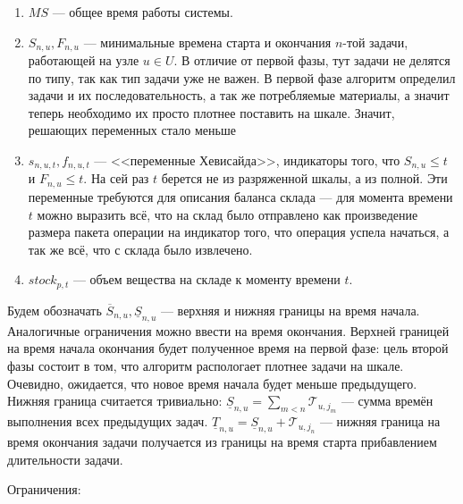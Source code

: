 \documentclass[12pt, twoside]{article}
\theoremstyle{definition}
\newcommand{\Tau}{\mathcal{T}}
\begin{document}
\begin{enumerate}

\item $MS$ --- общее время работы системы.
\item $S_{n, u}, F_{n, u}$ --- минимальные времена старта и окончания $n$-той задачи, работающей на узле $u \in U$. В отличие от первой фазы, тут задачи не делятся по типу, так как тип задачи уже не важен. В первой фазе алгоритм определил задачи и их последовательность, а так же потребляемые материалы, а значит теперь необходимо их просто плотнее поставить на шкале. Значит, решающих переменных стало меньше
\item $s_{n, u, t}, f_{n, u, t}$ --- <<переменные Хевисайда>>, индикаторы того, что $S_{n, u} \leq t$ и $F_{n, u} \leq t$. На сей раз $t$ берется не из разряженной шкалы, а из полной. Эти переменные требуются для описания баланса склада --- для момента времени $t$ можно выразить всё, что на склад было отправлено как произведение размера пакета операции на индикатор того, что операция успела начаться, а так же всё, что с склада было извлечено.
\item $stock_{p, t}$ --- объем вещества на складе к моменту времени $t$.

\end{enumerate}

Будем обозначать $\overline S_{n, u}, \underline S_{n, u}$ --- верхняя и нижняя границы на время начала. Аналогичные ограничения можно ввести на время окончания. Верхней границей на время начала окончания будет полученное время на первой фазе: цель второй фазы состоит в том, что алгоритм распологает плотнее задачи на шкале. Очевидно, ожидается, что новое время начала будет меньше предыдущего. Нижняя граница считается тривиально: $\underline S_{n, u} = \displaystyle\sum_{m < n} \Tau_{u, j_m}$ --- сумма времён выполнения всех предыдущих задач. $\underline T_{n, u} = \underline S_{n, u} + \Tau_{u, j_n}$ --- нижняя граница на время окончания задачи получается из границы на время старта прибавлением длительности задачи.

Ограничения:
\end{document}
